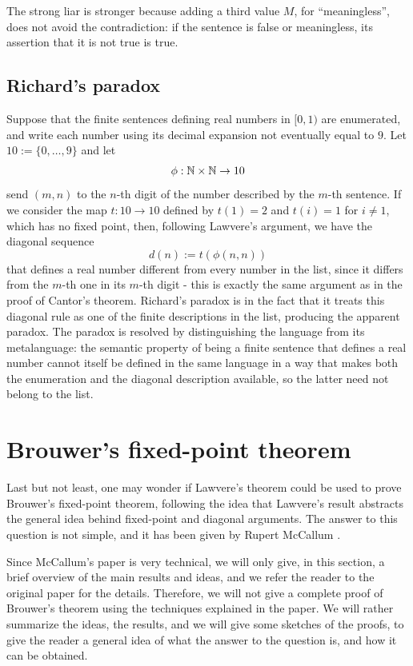 \begin{remark}
    The strong liar is stronger because adding a third value $M$, for ``meaningless'', does not avoid the contradiction: if the sentence is false or meaningless, its assertion that it is not true is true.
\end{remark}

\subsection*{Richard's paradox}
Suppose that the finite sentences defining real numbers in $[0,1)$ are enumerated, and write each number using its decimal expansion not eventually equal to $9$. Let $10:=\{0,\ldots,9\}$ and let
\[ \phi : \mathbb{N} \times \mathbb{N} \to 10 \]
send $(m,n)$ to the $n$-th digit of the number described by the $m$-th sentence.
If we consider the map $t : 10 \to 10$ defined by $t(1)=2$ and $t(i)=1$ for $i \ne 1$, which has no fixed point, then, following Lawvere's argument, we have the diagonal sequence
\[ d(n) := t(\phi(n,n)) \]
that defines a real number different from every number in the list, since it differs from the $m$-th one in its $m$-th digit - this is exactly the same argument as in the proof of Cantor's theorem.\newline
Richard's paradox is in the fact that it treats this diagonal rule as one of the finite descriptions in the list, producing the apparent paradox.\newline
The paradox is resolved by distinguishing the language from its metalanguage: the semantic property of being a finite sentence that defines a real number cannot itself be defined in the same language in a way that makes both the enumeration and the diagonal description available, so the latter need not belong to the list.

\section{Brouwer's fixed-point theorem}
Last but not least, one may wonder if Lawvere's theorem could be used to prove Brouwer's fixed-point theorem, following the idea
that Lawvere's result abstracts the general idea behind fixed-point and diagonal arguments. The answer to this question is not simple,
and it has been given by Rupert McCallum \Cite{McCallum2020}.

Since McCallum's paper is very technical, we will only give, in this section, a brief overview of the main results and ideas, and we refer the reader to the original paper for the details.
Therefore, we will not give a complete proof of Brouwer's theorem using the techniques explained in the paper. We will rather summarize the ideas, the results, and we will give some sketches of the proofs, to give the reader a general idea of
what the answer to the question is, and how it can be obtained.

